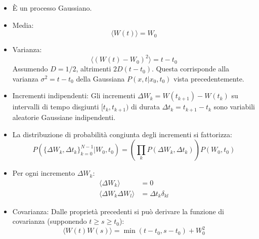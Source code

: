 \begin{itemize}
    \item È un processo Gaussiano.
    \item Media:
    \begin{equation}
    \langle W(t) \rangle = W_0
    \end{equation}
    \item Varianza:
    \begin{equation}
    \langle (W(t) - W_0)^2 \rangle = t - t_0
    \end{equation}
    Assumendo $D=1/2$, altrimenti $2D(t-t_0)$.
    Questa corrisponde alla varianza $\sigma^2 = t-t_0$ della Gaussiana $P(x,t|x_0,t_0)$ vista precedentemente.
    \item Incrementi indipendenti: Gli incrementi $\Delta W_k = W(t_{k+1}) - W(t_k)$ su intervalli di tempo disgiunti $[t_k, t_{k+1})$ di durata $\Delta t_k = t_{k+1}-t_k$ sono variabili aleatorie Gaussiane indipendenti.
    \item La distribuzione di probabilità congiunta degli incrementi si fattorizza:
    \begin{equation}
    P(\{\Delta W_k, \Delta t_k\}_{k=0}^{N-1} | W_0, t_0) = \left( \prod_k P(\Delta W_k, \Delta t_k) \right) P(W_0, t_0)
    \end{equation}
    \item Per ogni incremento $\Delta W_k$:
    \begin{equation}
    \begin{aligned}
    \langle \Delta W_k \rangle &= 0 \\
    \langle \Delta W_k \Delta W_l \rangle &= \Delta t_k \delta_{kl}
    \end{aligned}
    \end{equation}
    \item Covarianza: Dalle proprietà precedenti si può derivare la funzione di covarianza (supponendo $t \ge s \ge t_0$):
    \begin{equation}
    \langle W(t)W(s) \rangle = \min(t-t_0, s-t_0) + W_0^2
    \end{equation}
\end{itemize}

